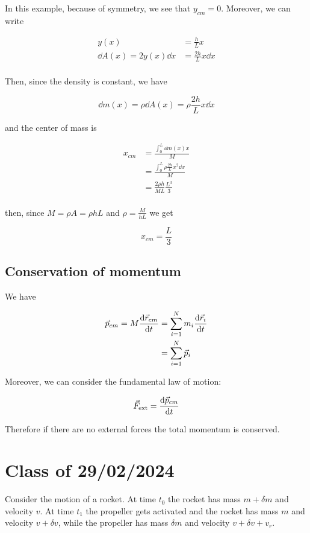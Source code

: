 \documentclass[10pt]{extarticle}
\begin{document}
In this example, because of symmetry, we see that $y_{cm} = 0$.
Moreover, we can write

\begin{align*}
    y(x)                      & = \frac{h}{L} x         \\
    \dd{A}(x) = 2 y(x) \dd{x} & = \frac{2h}{L} x \dd{x} \\
\end{align*}

Then, since the density is constant, we have

$$
    \dd{m}(x) = \rho \dd{A}(x) = \rho \frac{2h}{L} x \dd{x}
$$

and the center of mass is

\begin{align*}
    x_{cm} & = \frac{\int_0^L \dd{m}(x) x}{M}                  \\
           & = \frac{\int_0^L \rho \frac{2h}{L} x^2 \dd{x}}{M} \\
           & = \frac{2 \rho h}{ML} \frac{L^3}{3}               \\
\end{align*}

then, since $M = \rho A = \rho h L$ and $\rho = \frac{M}{hL}$ we get

$$
    x_{cm} = \frac{L}{3}
$$

\subsection{Conservation of momentum}

We have

\begin{align*}
    \vec{p}_{cm} = M \dv{\vec{r}_{cm}}{t} & = \sum_{i = 1}^N m_i \dv{\vec{r}_i}{t} \\
                                          & = \sum_{i = 1}^N \vec{p}_i
\end{align*}

Moreover, we can consider the fundamental law of motion:

$$
    \vec{F}_{\text{ext}} = \dv{\vec{p}_{cm}}{t}
$$

Therefore if there are no external forces the total momentum is conserved.

\section{Class of 29/02/2024}

Consider the motion of a rocket.
At time $t_0$ the rocket has mass $m + \delta m$ and velocity $v$.
At time $t_1$ the propeller gets activated and the rocket has mass $m$ and velocity $v + \delta v$, while the propeller has mass $\delta m$ and velocity $v + \delta v + v_r$.
\end{document}
